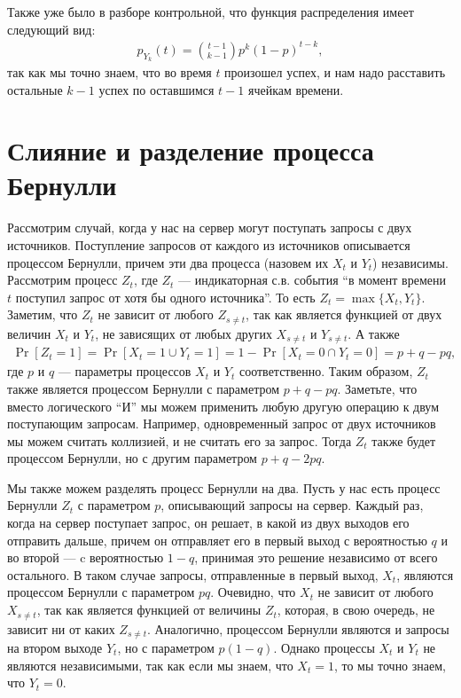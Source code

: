\documentclass[12pt]{article}
\begin{document}
Также уже было в разборе контрольной, что функция распределения имеет следующий вид:
\begin{align*}
  p_{Y_k}(t) = \binom{t - 1}{k - 1} p^k (1 - p)^{t - k},
\end{align*}
так как мы точно знаем, что во время $t$ произошел успех, и нам надо расставить остальные $k - 1$ успех по оставшимся $t - 1$ ячейкам времени.

\section{Слияние и разделение процесса Бернулли}

Рассмотрим случай, когда у нас на сервер могут поступать запросы с двух источников. Поступление запросов от каждого из источников описывается процессом Бернулли, причем эти два процесса (назовем их $X_t$ и $Y_t$) независимы. Рассмотрим процесс $Z_t$, где $Z_t$ --- индикаторная с.в. события ``в момент времени $t$ поступил запрос от хотя бы одного источника''. То есть $Z_t = \max\{X_t, Y_t\}$. Заметим, что $Z_t$ не зависит от любого $Z_{s \ne t}$, так как является функцией от двух величин $X_t$ и $Y_t$, не зависящих от любых других $X_{s \ne t}$ и $Y_{s \ne t}$. А также 
\begin{align*}
  \Pr[Z_t = 1] = \Pr[X_t = 1 \cup Y_t = 1] = 1 - \Pr[X_t = 0 \cap Y_t = 0] = p + q - pq,
\end{align*}
где $p$ и $q$ --- параметры процессов $X_t$ и $Y_t$ соответственно. Таким образом, $Z_t$ также является процессом Бернулли с параметром $p + q - pq$. Заметьте, что вместо логического ``И'' мы можем применить любую другую операцию к двум поступающим запросам. Например, одновременный запрос от двух источников мы можем считать коллизией, и не считать его за запрос. Тогда $Z_t$ также будет процессом Бернулли, но с другим параметром $p + q - 2pq$.

Мы также можем разделять процесс Бернулли на два. Пусть у нас есть процесс Бернулли $Z_t$ с параметром $p$, описывающий запросы на сервер. Каждый раз, когда на сервер поступает запрос, он решает, в какой из двух выходов его отправить дальше, причем он отправляет его в первый выход с вероятностью $q$  и во второй --- c вероятностью $1 - q$, принимая это решение независимо от всего остального. В таком случае запросы, отправленные в первый выход, $X_t$, являются процессом Бернулли с параметром $pq$. Очевидно, что $X_t$ не зависит от любого $X_{s \ne t}$, так как является функцией от величины $Z_t$, которая, в свою очередь, не зависит ни от каких $Z_{s \ne t}$. Аналогично, процессом Бернулли являются и запросы на втором выходе $Y_t$, но с параметром $p(1 - q)$. Однако процессы $X_t$ и $Y_t$ не являются независимыми, так как если мы знаем, что $X_t = 1$, то мы точно знаем, что $Y_t = 0$.
\end{document}
